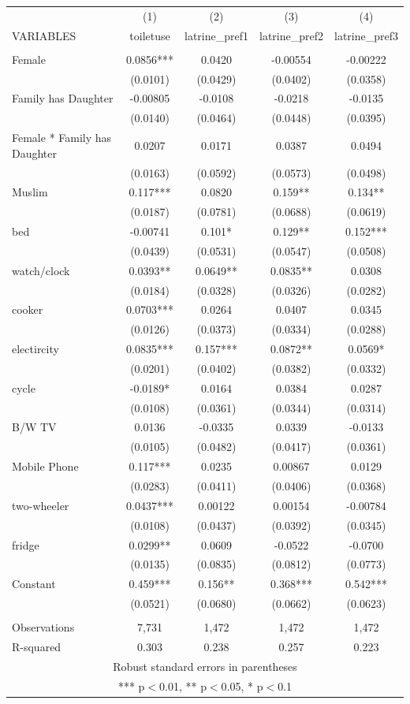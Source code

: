 \documentclass[]{article}
\begin{document}
\begin{tabular}{lcccc} \hline
 & (1) & (2) & (3) & (4) \\
VARIABLES & toiletuse & latrine\_pref1 & latrine\_pref2 & latrine\_pref3 \\ \hline
 &  &  &  &  \\
Female & 0.0856*** & 0.0420 & -0.00554 & -0.00222 \\
 & (0.0101) & (0.0429) & (0.0402) & (0.0358) \\
Family has Daughter & -0.00805 & -0.0108 & -0.0218 & -0.0135 \\
 & (0.0140) & (0.0464) & (0.0448) & (0.0395) \\
Female * Family has Daughter & 0.0207 & 0.0171 & 0.0387 & 0.0494 \\
 & (0.0163) & (0.0592) & (0.0573) & (0.0498) \\
Muslim & 0.117*** & 0.0820 & 0.159** & 0.134** \\
 & (0.0187) & (0.0781) & (0.0688) & (0.0619) \\
bed & -0.00741 & 0.101* & 0.129** & 0.152*** \\
 & (0.0439) & (0.0531) & (0.0547) & (0.0508) \\
watch/clock & 0.0393** & 0.0649** & 0.0835** & 0.0308 \\
 & (0.0184) & (0.0328) & (0.0326) & (0.0282) \\
cooker & 0.0703*** & 0.0264 & 0.0407 & 0.0345 \\
 & (0.0126) & (0.0373) & (0.0334) & (0.0288) \\
electircity & 0.0835*** & 0.157*** & 0.0872** & 0.0569* \\
 & (0.0201) & (0.0402) & (0.0382) & (0.0332) \\
cycle & -0.0189* & 0.0164 & 0.0384 & 0.0287 \\
 & (0.0108) & (0.0361) & (0.0344) & (0.0314) \\
B/W TV & 0.0136 & -0.0335 & 0.0339 & -0.0133 \\
 & (0.0105) & (0.0482) & (0.0417) & (0.0361) \\
Mobile Phone & 0.117*** & 0.0235 & 0.00867 & 0.0129 \\
 & (0.0283) & (0.0411) & (0.0406) & (0.0368) \\
two-wheeler & 0.0437*** & 0.00122 & 0.00154 & -0.00784 \\
 & (0.0108) & (0.0437) & (0.0392) & (0.0345) \\
fridge & 0.0299** & 0.0609 & -0.0522 & -0.0700 \\
 & (0.0135) & (0.0835) & (0.0812) & (0.0773) \\
Constant & 0.459*** & 0.156** & 0.368*** & 0.542*** \\
 & (0.0521) & (0.0680) & (0.0662) & (0.0623) \\
 &  &  &  &  \\
Observations & 7,731 & 1,472 & 1,472 & 1,472 \\
 R-squared & 0.303 & 0.238 & 0.257 & 0.223 \\ \hline
\multicolumn{5}{c}{ Robust standard errors in parentheses} \\
\multicolumn{5}{c}{ *** p$<$0.01, ** p$<$0.05, * p$<$0.1} \\
\end{tabular}
\end{document}

